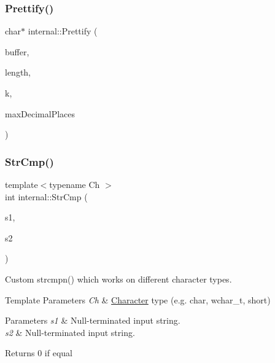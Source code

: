 \subsubsection{\texorpdfstring{Prettify()}{Prettify()}}
{\footnotesize\ttfamily char$\ast$ internal\+::\+Prettify (\begin{DoxyParamCaption}\item[{char $\ast$}]{buffer,  }\item[{int}]{length,  }\item[{int}]{k,  }\item[{int}]{max\+Decimal\+Places }\end{DoxyParamCaption})\hspace{0.3cm}{\ttfamily [inline]}}

\mbox{\label{namespaceinternal_a8986308d308f29092fef8a82e64debef}} 
\subsubsection{\texorpdfstring{Str\+Cmp()}{StrCmp()}}
{\footnotesize\ttfamily template$<$typename Ch $>$ \\
int internal\+::\+Str\+Cmp (\begin{DoxyParamCaption}\item[{const Ch $\ast$}]{s1,  }\item[{const Ch $\ast$}]{s2 }\end{DoxyParamCaption})\hspace{0.3cm}{\ttfamily [inline]}}



Custom strcmpn() which works on different character types. 


\begin{DoxyTemplParams}{Template Parameters}
{\em Ch} & \hyperlink{structCharacter}{Character} type (e.\+g. char, wchar\+\_\+t, short) \\
\hline
\end{DoxyTemplParams}

\begin{DoxyParams}{Parameters}
{\em s1} & Null-\/terminated input string. \\
\hline
{\em s2} & Null-\/terminated input string. \\
\hline
\end{DoxyParams}
\begin{DoxyReturn}{Returns}
0 if equal 
\end{DoxyReturn}
\mbox{\label{namespaceinternal_a86326fb0c9d7c7ea8edd7deedbb2b26e}} 
